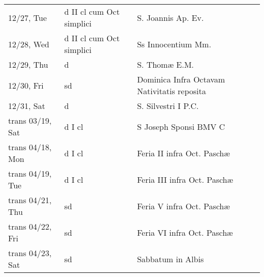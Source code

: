 \documentclass{article}
\begin{document}
\begin{longtable}{ l l l }
12/27, Tue & d II cl cum Oct simplici & S. Joannis Ap. Ev.\\
12/28, Wed & d II cl cum Oct simplici & Ss Innocentium Mm.\\
12/29, Thu & d & S. Thomæ E.M.\\
12/30, Fri & sd & Dominica Infra Octavam Nativitatis reposita\\
12/31, Sat & d & S. Silvestri I P.C.\\
trans 03/19, Sat & d I cl & S Joseph Sponsi BMV C\\
trans 04/18, Mon & d I cl & Feria II infra Oct. Paschæ\\
trans 04/19, Tue & d I cl & Feria III infra Oct. Paschæ\\
trans 04/21, Thu & sd & Feria V infra Oct. Paschæ\\
trans 04/22, Fri & sd & Feria VI infra Oct. Paschæ\\
trans 04/23, Sat & sd & Sabbatum in Albis\\
\end{longtable}
\end{document}
